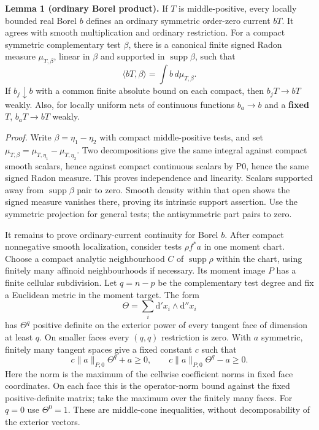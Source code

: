 \documentclass[
  11pt,
]{article}
\begin{document}
\textbf{Lemma 1 (ordinary Borel product).} If \(T\) is middle-positive,
every locally bounded real Borel \(b\) defines an ordinary symmetric
order-zero current \(bT\). It agrees with smooth multiplication and
ordinary restriction. For a compact symmetric complementary test
\(\beta\), there is a canonical finite signed Radon measure
\(\mu_{T,\beta}\), linear in \(\beta\) and supported in
\(\operatorname{supp}\beta\), such that
\[ \langle bT,\beta\rangle=\int b\,d\mu_{T,\beta}.               \tag{3}\]
If \(b_j\downarrow b\) with a common finite absolute bound on each
compact, then \(b_jT\to bT\) weakly. Also, for locally uniform nets of
continuous functions \(b_a\to b\) and a \textbf{fixed} \(T\),
\(b_aT\to bT\) weakly.

\emph{Proof.} Write \(\beta=\eta_1-\eta_2\) with compact middle-positive
tests, and set \(\mu_{T,\beta}=\mu_{T,\eta_1}-\mu_{T,\eta_2}\). Two
decompositions give the same integral against compact smooth scalars,
hence against compact continuous scalars by P0, hence the same signed
Radon measure. This proves independence and linearity. Scalars supported
away from \(\operatorname{supp}\beta\) pair to zero. Smooth density
within that open shows the signed measure vanishes there, proving its
intrinsic support assertion. Use the symmetric projection for general
tests; the antisymmetric part pairs to zero.

It remains to prove ordinary-current continuity for Borel \(b\). After
compact nonnegative smooth localization, consider tests \(\rho f^*a\) in
one moment chart. Choose a compact analytic neighbourhood \(C\) of
\(\operatorname{supp}\rho\) within the chart, using finitely many
affinoid neighbourhoods if necessary. Its moment image \(P\) has a
finite cellular subdivision. Let \(q=n-p\) be the complementary test
degree and fix a Euclidean metric in the moment target. The form
\[\Theta=\sum_i\mathrm d'x_i\wedge\mathrm d''x_i\] has \(\Theta^q\)
positive definite on the exterior power of every tangent face of
dimension at least \(q\). On smaller faces every \((q,q)\) restriction
is zero. With \(a\) symmetric, finitely many tangent spaces give a fixed
constant \(c\) such that \[c\|a\|_{P,0}\Theta^q+a\geq0,\qquad
  c\|a\|_{P,0}\Theta^q-a\geq0.                               \tag{4}\]
Here the norm is the maximum of the cellwise coefficient norms in fixed
face coordinates. On each face this is the operator-norm bound against
the fixed positive-definite matrix; take the maximum over the finitely
many faces. For \(q=0\) use \(\Theta^0=1\). These are middle-cone
inequalities, without decomposability of the exterior vectors.
\end{document}
